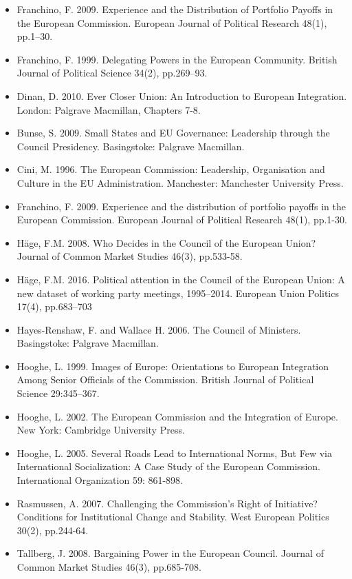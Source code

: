\begin{itemize}
	\item Franchino, F. 2009. Experience and the Distribution of Portfolio Payoffs in the European Commission. European Journal of Political Research 48(1), pp.1–30.
	\item Franchino, F. 1999. Delegating Powers in the European Community. British Journal of Political Science 34(2), pp.269–93.
	\item Dinan, D. 2010. Ever Closer Union: An Introduction to European Integration. London: Palgrave Macmillan, Chapters 7-8.
	\item Bunse, S. 2009. Small States and EU Governance: Leadership through the Council Presidency. Basingstoke: Palgrave Macmillan.
	\item Cini, M. 1996. The European Commission: Leadership, Organisation and Culture in the EU Administration. Manchester: Manchester University Press.
	\item Franchino, F. 2009. Experience and the distribution of portfolio payoffs in the European Commission. European Journal of Political Research 48(1), pp.1-30.
	\item H{\"a}ge, F.M. 2008. Who Decides in the Council of the European Union? Journal of Common Market Studies 46(3), pp.533-58.
	\item H{\"a}ge, F.M. 2016. Political attention in the Council of the European Union: A new dataset of working party meetings, 1995–2014. European Union Politics 17(4), pp.683–703
	\item Hayes-Renshaw, F. and Wallace H. 2006. The Council of Ministers. Basingstoke: Palgrave Macmillan.
	\item Hooghe, L. 1999. Images of Europe: Orientations to European Integration Among Senior Officials of the Commission. British Journal of Political Science 29:345–367.
	\item Hooghe, L. 2002. The European Commission and the Integration of Europe. New York: Cambridge University Press. 
	\item Hooghe, L. 2005. Several Roads Lead to International Norms, But Few via International Socialization: A Case Study of the European Commission. International Organization 59: 861-898.
	\item Rasmussen, A. 2007. Challenging the Commission’s Right of Initiative? Conditions for Institutional Change and Stability. West European Politics 30(2), pp.244-64.
	\item Tallberg, J. 2008. Bargaining Power in the European Council. Journal of Common Market Studies 46(3), pp.685-708.

\end{itemize}
